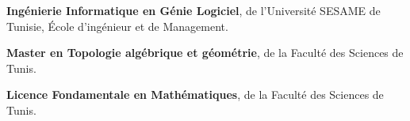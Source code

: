 %
%
%


\begin{scholarship}
					{\textbf{Ingénierie Informatique en Génie Logiciel}, de l'Université SESAME de Tunisie, École d’ingénieur et de Management.}
				
					{\textbf{Master en Topologie algébrique et géométrie}, de la Faculté des Sciences de Tunis.}
					
					{\textbf{Licence Fondamentale en Mathématiques}, de la Faculté des Sciences de Tunis.}
	
\end{scholarship}